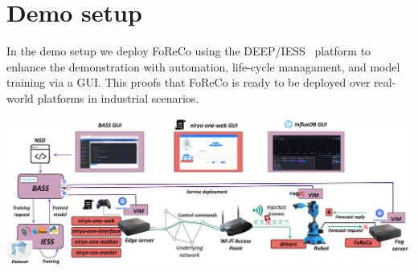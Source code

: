 \documentclass[a0,portrait]{a0poster}
\begin{document}
\section*{Demo setup}
\label{sec:setup}
In the demo setup we deploy FoReCo using the
DEEP/IESS~\cite{deep} platform to enhance the
demonstration with automation, life-cycle managament,
and model training via a GUI. This proofs that FoReCo
is ready to be deployed over real-world platforms
in industrial scenarios.

\begin{center}\vspace{1cm}
	\includegraphics[width=\linewidth] {figures/experimental-setup.pdf}
    \label{fig:setup}
\end{center}\vspace{1cm}


\color{DarkSlateGray} %

\end{document}
